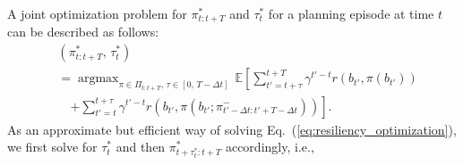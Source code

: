 \documentclass[letterpaper]{article} %
\newcommand{\argmax}{\mathop{\mathrm{argmax}}}
\begin{document}
A joint optimization problem for $\pi_{t:t+T}^*$ and $\tau_t^*$ for a planning episode at time $t$ can be described as follows:
%
%
\begin{align}
  &(\pi_{t:t+T}^*, \, \tau_t^*)
  \nonumber \\
  & = \argmax_{\pi \in \Pi_{t:t+T}, \, \tau \in [0,\, T-\Delta t]} \, \mathbb{E} \left[ \sum_{t'=t+\tau}^{t+T} \gamma^{t'-t} r(b_{t'}, \pi(b_{t'})) \right.
  \nonumber \\
  &\quad \left. + \sum_{t'=t}^{t+\tau} \gamma^{t'-t} r(b_{t'}, \pi(b_{t'}; \pi_{{t'}-\Delta t:{t'}+T-\Delta t}^-)) \right] \!\!.
  \label{eq:resiliency_optimization}
\end{align}
\normalsize
%
As an approximate but efficient way of solving Eq.~(\ref{eq:resiliency_optimization}), we first solve for $\tau^*_t$ and then $\pi^*_{t+\tau^*_t:t+T}$ accordingly, i.e., 
\end{document}
